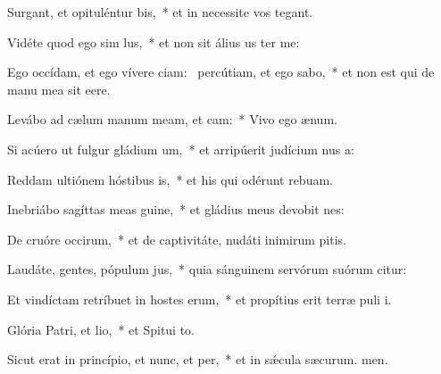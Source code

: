 \item Surgant, et opituléntur bis,~* et in necessite vos tegant.
\item Vidéte quod ego sim lus,~* et non sit álius us ter me:
\item Ego occídam, et ego vívere ciam:~\pscross{} percútiam, et ego sabo,~* et non est qui de manu mea sit eere.
\item Levábo ad cælum manum meam, et cam:~* Vivo ego  ænum.
\item Si acúero ut fulgur gládium um,~* et arripúerit judícium nus a:
\item Reddam ultiónem hóstibus is,~* et his qui odérunt  rebuam.
\item Inebriábo sagíttas meas guine,~* et gládius meus devobit nes:
\item De cruóre occirum,~* et de captivitáte, nudáti inimirum pitis.
\item Laudáte, gentes, pópulum jus,~* quia sánguinem servórum suórum citur:
\item Et vindíctam retríbuet in hostes erum,~* et propítius erit terræ puli i.
\item \singlecolsep
\item Glória Patri, et lio,~* et Spitui to.
\item Sicut erat in princípio, et nunc, et per,~* et in sǽcula sæcurum. men.

